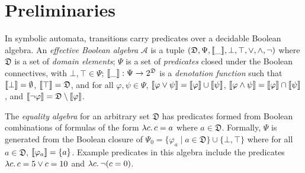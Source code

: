 \section{Preliminaries}

In symbolic automata, transitions carry predicates over a decidable Boolean algebra.
    An \emph{effective Boolean algebra} $\mathcal{A}$
    is a tuple $(\mathfrak{D}, \Psi, \llbracket {\_} \rrbracket, \bot, \top, \vee, \wedge, \neg)$ where
    $\mathfrak{D}$ is a set of \emph{domain elements};
    $\Psi$ is a set of \emph{predicates} closed under the Boolean connectives, with $\bot, \top \in \Psi$;
    $\llbracket {\_} \rrbracket : \Psi \rightarrow 2^\mathfrak{D}$
    is a \emph{denotation function} such that
    \rone $\llbracket {\bot} \rrbracket = \emptyset$,
    \rtwo $\llbracket {\top} \rrbracket = \mathfrak{D}$,
    and \rthree for all $\varphi, \psi \in \Psi$,
        $\llbracket {\varphi \vee \psi} \rrbracket = \llbracket {\varphi} \rrbracket \cup \llbracket {\psi} \rrbracket$,
        $\llbracket {\varphi \wedge \psi} \rrbracket = \llbracket {\varphi} \rrbracket \cap \llbracket {\psi} \rrbracket$,
        and $\llbracket {\neg \varphi} \rrbracket = \mathfrak{D} \setminus \llbracket {\varphi} \rrbracket$.

%

\begin{example}
    The \emph{equality algebra} for an arbitrary set $\mathfrak{D}$
    has predicates formed from Boolean combinations of
    formulas of the form $\lambda c \ldotp c = a$ where $a \in \mathfrak{D}$.
    Formally, $\Psi$ is generated from the Boolean closure of
    $\Psi_0 = \{\varphi_a \mid a \in \mathfrak{D}\} \cup \{\bot, \top\}$
    where for all $a \in \mathfrak{D}$, $\llbracket {\varphi_a} \rrbracket = \{a\}$.
    Example predicates in this algebra include the predicates
    $\lambda c \ldotp c = 5 \vee c = 10$ and $\lambda c \ldotp \neg(c = 0)$.
\end{example}

